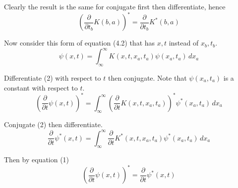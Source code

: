 \documentclass[12pt]{article}
\begin{document}
Clearly the result is the same for conjugate first then differentiate, hence
\begin{equation*}
\left(\frac{\partial}{\partial t_b}K(b,a)\right)^*
=\frac{\partial}{\partial t_b}K^*(b,a)
\tag{1}
\end{equation*}

Now consider this form of equation (4.2) that has $x,t$ instead of $x_b,t_b$.
\begin{equation*}
\psi(x,t)=\int_{\infty}^\infty K(x,t,x_a,t_a)\psi(x_a,t_a)\,dx_a
\tag{2}
\end{equation*}

Differentiate (2) with respect to $t$ then conjugate.
Note that $\psi(x_a,t_a)$ is a constant with respect to $t$.
\begin{equation*}
\left(\frac{\partial}{\partial t}\psi(x,t)\right)^*
=\int_{\infty}^\infty\left(\frac{\partial}{\partial t}K(x,t,x_a,t_a)\right)^*\psi^*(x_a,t_a)\,dx_a
\end{equation*}

Conjugate (2) then differentiate.
\begin{equation*}
\frac{\partial}{\partial t}\psi^*(x,t)
=\int_{\infty}^\infty\frac{\partial}{\partial t}K^*(x,t,x_a,t_a)\psi^*(x_a,t_a)\,dx_a
\end{equation*}

Then by equation (1)
\begin{equation*}
\left(\frac{\partial}{\partial t}\psi(x,t)\right)^*=\frac{\partial}{\partial t}\psi^*(x,t)
\end{equation*}
\end{document}
